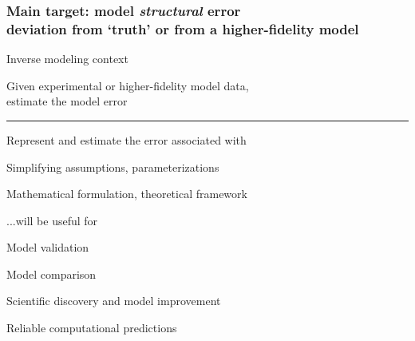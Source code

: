 
\begin{frame}[t]
\label{motivation}

\frametitle{Main target: model \emph{structural} error \\ \small{ deviation from `truth' or from a higher-fidelity model}}

\bbi
\item Inverse modeling context
\bgi
\item Given experimental or higher-fidelity model data,\\
estimate the model error
\egi
\medskip
\hrule
\medskip
\item Represent and estimate the error associated with
\bgi
\item Simplifying assumptions, parameterizations
\item Mathematical formulation, theoretical framework
\egi
\medskip
\item ...will be useful for
\bgi
\item Model validation
\item Model comparison
\item Scientific discovery and model improvement
\item Reliable computational predictions
\egi

\ebi
\end{frame}



